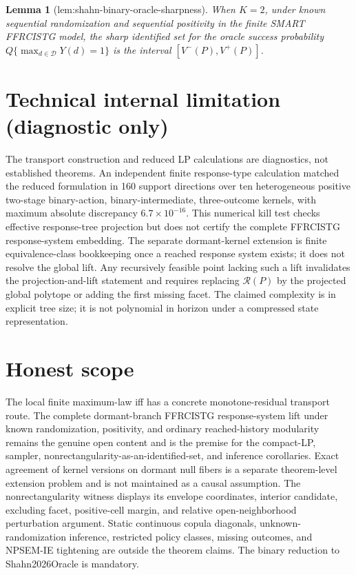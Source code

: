 \documentclass{article}
\newtheorem{lemma}{Lemma}
\begin{document}
\begin{lemma}[lem:shahn-binary-oracle-sharpness]\label{lem:shahn-binary-oracle-sharpness}
When \(K=2\), under known sequential randomization and sequential positivity in the finite SMART FFRCISTG model, the sharp identified set for the oracle success probability \(Q\{\max_{d\in\mathcal D}Y(d)=1\}\) is the interval \([V^-(P),V^+(P)]\).
\end{lemma}

\section*{Technical internal limitation (diagnostic only)}

The transport construction and reduced LP calculations are diagnostics, not established theorems. An independent finite response-type calculation matched the reduced formulation in 160 support directions over ten heterogeneous positive two-stage binary-action, binary-intermediate, three-outcome kernels, with maximum absolute discrepancy \(6.7\times10^{-16}\). This numerical kill test checks effective response-tree projection but does not certify the complete FFRCISTG response-system embedding. The separate dormant-kernel extension is finite equivalence-class bookkeeping once a reached response system exists; it does not resolve the global lift. Any recursively feasible point lacking such a lift invalidates the projection-and-lift statement and requires replacing \(\mathcal R(P)\) by the projected global polytope or adding the first missing facet. The claimed complexity is in explicit tree size; it is not polynomial in horizon under a compressed state representation.

\section{Honest scope}

The local finite maximum-law iff has a concrete monotone-residual transport route. The complete dormant-branch FFRCISTG response-system lift under known randomization, positivity, and ordinary reached-history modularity remains the genuine open content and is the premise for the compact-LP, sampler, nonrectangularity-as-an-identified-set, and inference corollaries. Exact agreement of kernel versions on dormant null fibers is a separate theorem-level extension problem and is not maintained as a causal assumption. The nonrectangularity witness displays its envelope coordinates, interior candidate, excluding facet, positive-cell margin, and relative open-neighborhood perturbation argument. Static continuous copula diagonals, unknown-randomization inference, restricted policy classes, missing outcomes, and NPSEM-IE tightening are outside the theorem claims. The binary reduction to Shahn2026Oracle is mandatory.
\end{document}
